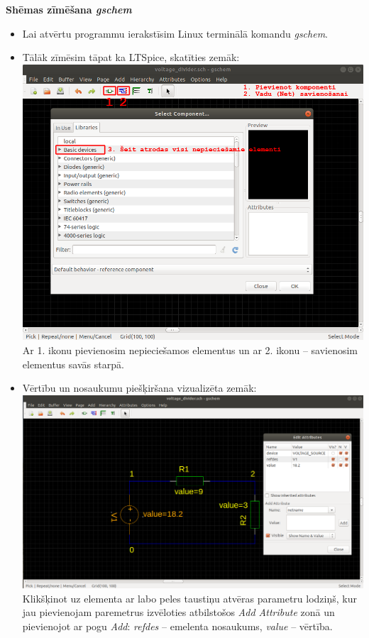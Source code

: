\documentclass[12pt,a4paper]{report}
\begin{document}
{\large\bfseries Shēmas zīmēšana \emph{gschem}\par}
\begin{itemize}
  \item Lai atvērtu programmu ierakstīsim Linux terminālā komandu \emph{gschem}.
  \item Tālāk zīmēsim tāpat ka LTSpice, skatīties zemāk:\\
        \includegraphics[scale=0.4]{1}\\
        Ar 1. ikonu pievienosim nepieciešamos elementus un ar 2. ikonu – savienosim elementus savās starpā.
  \item Vērtību un nosaukumu piešķiršana vizualizēta zemāk:\\
        \includegraphics[scale=0.3]{2}\\
        Klikšķinot uz elementa ar labo peles taustiņu atvēras parametru lodziņš, kur jau pievienojam paremetrus izvēloties atbilstošos \emph{Add Attribute} zonā un pievienojot ar pogu \emph{Add}: \emph{refdes} – emelenta nosaukums, \emph{value} – vērtība.

\end{itemize}
\end{document}

